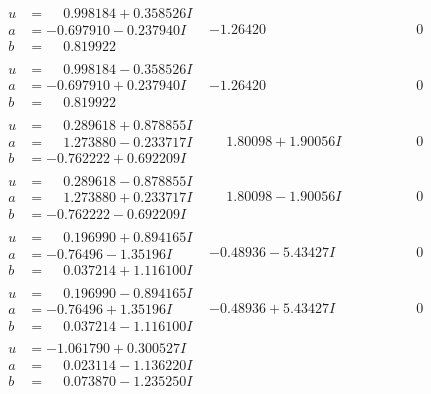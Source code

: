 \documentclass[1p]{elsarticle_modified}
\theoremstyle{definition}
\begin{document}
$$\begin{array}{c|c|c}
\begin{aligned}
u &= \phantom{-}0.998184 + 0.358526 I \\
a &= -0.697910 - 0.237940 I \\
b &= \phantom{-}0.819922\phantom{ +0.000000I}\end{aligned}
 & -1.26420\phantom{ +0.000000I} & \phantom{-0.000000 } 0 \\ \hline\begin{aligned}
u &= \phantom{-}0.998184 - 0.358526 I \\
a &= -0.697910 + 0.237940 I \\
b &= \phantom{-}0.819922\phantom{ +0.000000I}\end{aligned}
 & -1.26420\phantom{ +0.000000I} & \phantom{-0.000000 } 0 \\ \hline\begin{aligned}
u &= \phantom{-}0.289618 + 0.878855 I \\
a &= \phantom{-}1.273880 - 0.233717 I \\
b &= -0.762222 + 0.692209 I\end{aligned}
 & \phantom{-}1.80098 + 1.90056 I & \phantom{-0.000000 } 0 \\ \hline\begin{aligned}
u &= \phantom{-}0.289618 - 0.878855 I \\
a &= \phantom{-}1.273880 + 0.233717 I \\
b &= -0.762222 - 0.692209 I\end{aligned}
 & \phantom{-}1.80098 - 1.90056 I & \phantom{-0.000000 } 0 \\ \hline\begin{aligned}
u &= \phantom{-}0.196990 + 0.894165 I \\
a &= -0.76496 - 1.35196 I \\
b &= \phantom{-}0.037214 + 1.116100 I\end{aligned}
 & -0.48936 - 5.43427 I & \phantom{-0.000000 } 0 \\ \hline\begin{aligned}
u &= \phantom{-}0.196990 - 0.894165 I \\
a &= -0.76496 + 1.35196 I \\
b &= \phantom{-}0.037214 - 1.116100 I\end{aligned}
 & -0.48936 + 5.43427 I & \phantom{-0.000000 } 0 \\ \hline\begin{aligned}
u &= -1.061790 + 0.300527 I \\
a &= \phantom{-}0.023114 - 1.136220 I \\
b &= \phantom{-}0.073870 - 1.235250 I\end{aligned}

\end{array}$$
\end{document}
